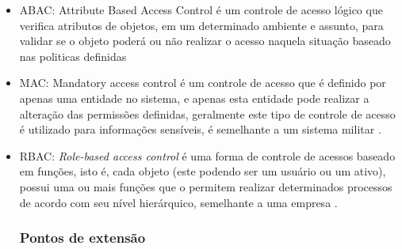 \begin{itemize}
    \item ABAC: Attribute Based Access Control é um controle de acesso lógico que verifica atributos de objetos, em um determinado ambiente e assunto, para validar se o objeto poderá ou não realizar o acesso naquela situação baseado nas politicas definidas \cite{hu2015attribute}
    \item MAC: Mandatory access control é um controle de acesso que é definido por apenas uma entidade no sistema, e apenas esta entidade pode realizar a alteração das permissões definidas, geralmente este tipo de controle de acesso é utilizado para informações sensíveis, é semelhante a um sistema militar \cite{lindqvist2006mandatory}.
    \item RBAC: \textit{Role-based access control} é uma forma de controle de acessos baseado em funções, isto é, cada objeto (este podendo ser um usuário ou um ativo), possui uma ou mais funções que o permitem realizar determinados processos de acordo com seu nível hierárquico, semelhante a uma empresa \cite{sandhu2000nist}.
    
\noindent\subsubsection{Pontos de extensão}
\end{itemize}